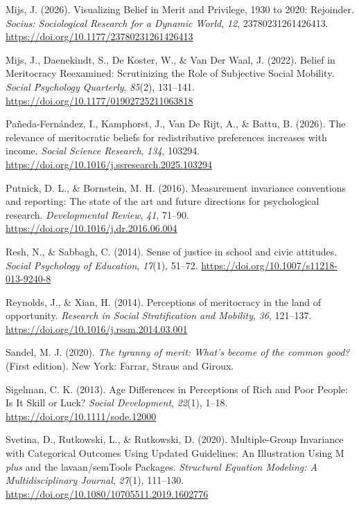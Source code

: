 \documentclass[
  13pt,
]{article}
\newlength{\cslhangindent}
\newenvironment{CSLReferences}[2] %
 {\begin{list}{}{%
  \setlength{\itemindent}{0pt}
  \setlength{\leftmargin}{0pt}
  \setlength{\parsep}{0pt}
  \ifodd #1
   \setlength{\leftmargin}{\cslhangindent}
   \setlength{\itemindent}{-1\cslhangindent}
  \fi
  \setlength{\itemsep}{#2\baselineskip}}}
 {\end{list}}
\begin{document}
\begin{CSLReferences}{1}{0}
Mijs, J. (2026). Visualizing {Belief} in {Merit} and {Privilege}, 1930
to 2020: {Rejoinder}. \emph{Socius: Sociological Research for a Dynamic
World}, \emph{12}, 23780231261426413.
\url{https://doi.org/10.1177/23780231261426413}

Mijs, J., Daenekindt, S., De Koster, W., \& Van Der Waal, J. (2022).
Belief in {Meritocracy Reexamined}: {Scrutinizing} the {Role} of
{Subjective Social Mobility}. \emph{Social Psychology Quarterly},
\emph{85}(2), 131--141. \url{https://doi.org/10.1177/01902725211063818}

Pañeda-Fernández, I., Kamphorst, J., Van De Rijt, A., \& Battu, B.
(2026). The relevance of meritocratic beliefs for redistributive
preferences increases with income. \emph{Social Science Research},
\emph{134}, 103294.
\url{https://doi.org/10.1016/j.ssresearch.2025.103294}

Putnick, D. L., \& Bornstein, M. H. (2016). Measurement invariance
conventions and reporting: {The} state of the art and future directions
for psychological research. \emph{Developmental Review}, \emph{41},
71--90. \url{https://doi.org/10.1016/j.dr.2016.06.004}

Resh, N., \& Sabbagh, C. (2014). Sense of justice in school and civic
attitudes. \emph{Social Psychology of Education}, \emph{17}(1), 51--72.
\url{https://doi.org/10.1007/s11218-013-9240-8}

Reynolds, J., \& Xian, H. (2014). Perceptions of meritocracy in the land
of opportunity. \emph{Research in Social Stratification and Mobility},
\emph{36}, 121--137. \url{https://doi.org/10.1016/j.rssm.2014.03.001}

Sandel, M. J. (2020). \emph{The tyranny of merit: {What}'s become of the
common good?} (First edition). New York: {Farrar, Straus and Giroux}.

Sigelman, C. K. (2013). Age {Differences} in {Perceptions} of {Rich} and
{Poor People}: {Is It Skill} or {Luck}? \emph{Social Development},
\emph{22}(1), 1--18. \url{https://doi.org/10.1111/sode.12000}

Svetina, D., Rutkowski, L., \& Rutkowski, D. (2020). Multiple-{Group
Invariance} with {Categorical Outcomes Using Updated Guidelines}: {An
Illustration Using M} {\emph{plus}} and the lavaan/{semTools Packages}.
\emph{Structural Equation Modeling: A Multidisciplinary Journal},
\emph{27}(1), 111--130.
\url{https://doi.org/10.1080/10705511.2019.1602776}


\end{CSLReferences}
\end{document}

